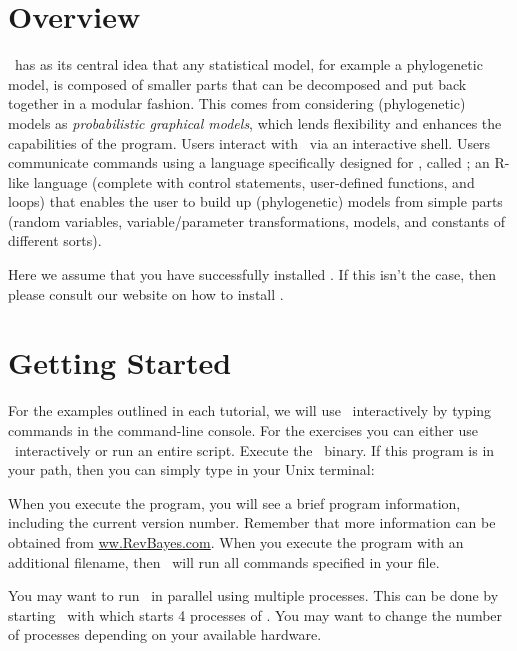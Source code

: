 
\section{Overview}

\RevBayes~has as its central idea that any statistical model, for example a phylogenetic model, is composed of smaller parts that can be decomposed and put back together in a modular fashion. This comes from considering (phylogenetic) models as \textit{probabilistic graphical models}, which lends flexibility and enhances the capabilities of the program. 
Users interact with \RevBayes~via an interactive shell.
Users communicate commands using a language specifically designed for \RevBayes, called \Rev; an R-like language (complete with control statements, user-defined functions, and loops) that enables the user to build up (phylogenetic) models from simple parts (random variables, variable/parameter transformations, models, and constants of different sorts).
 
Here we assume that you have successfully installed \RevBayes.
If this isn't the case, then please consult our website on how to install \RevBayes.



\bigskip
\section{Getting Started}

For the examples outlined in each tutorial, we will use \RevBayes~interactively by typing commands in the command-line console.
For the exercises you can either use \RevBayes~interactively or run an entire script.
Execute the \RevBayes~binary. If this program is in your path, then you can simply type in your Unix terminal:


When you execute the program, you will see a brief program information, including the current version number. 
Remember that more information can be obtained from \href{www.RevBayes.com}{ww.RevBayes.com}.
When you execute the program with an additional filename, \EG
{}
then \RevBayes~will run all commands specified in your file.

You may want to run \RevBayes~in parallel using multiple processes.
This can be done by starting \RevBayes~with
which starts 4 processes of \RevBayes.
You may want to change the number of processes depending on your available hardware.

